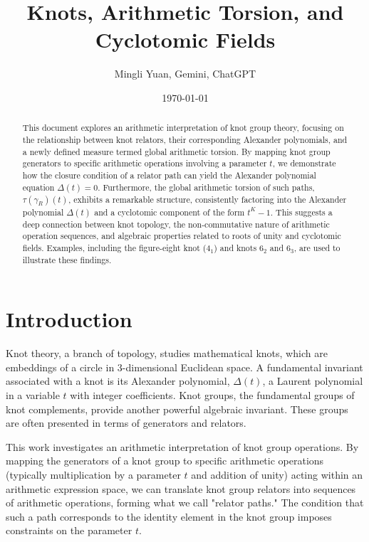 \documentclass{article}[a4paper,12pt]
\title{Knots, Arithmetic Torsion, and Cyclotomic Fields}
\author{Mingli Yuan, Gemini, ChatGPT}
\date{\today}
\begin{document}
\maketitle

\begin{abstract}
This document explores an arithmetic interpretation of knot group theory, focusing on the relationship between knot relators, their corresponding Alexander polynomials, and a newly defined measure termed global arithmetic torsion. By mapping knot group generators to specific arithmetic operations involving a parameter $t$, we demonstrate how the closure condition of a relator path can yield the Alexander polynomial equation $\Delta(t)=0$. Furthermore, the global arithmetic torsion of such paths, $\tau(\gamma_R)(t)$, exhibits a remarkable structure, consistently factoring into the Alexander polynomial $\Delta(t)$ and a cyclotomic component of the form $t^K-1$. This suggests a deep connection between knot topology, the non-commutative nature of arithmetic operation sequences, and algebraic properties related to roots of unity and cyclotomic fields. Examples, including the figure-eight knot ($4_1$) and knots $6_2$ and $6_3$, are used to illustrate these findings.
\end{abstract}

\tableofcontents

\section{Introduction}

Knot theory, a branch of topology, studies mathematical knots, which are embeddings of a circle in 3-dimensional Euclidean space. A fundamental invariant associated with a knot is its Alexander polynomial, $\Delta(t)$, a Laurent polynomial in a variable $t$ with integer coefficients. Knot groups, the fundamental groups of knot complements, provide another powerful algebraic invariant. These groups are often presented in terms of generators and relators.

This work investigates an arithmetic interpretation of knot group operations. By mapping the generators of a knot group to specific arithmetic operations (typically multiplication by a parameter $t$ and addition of unity) acting within an arithmetic expression space, we can translate knot group relators into sequences of arithmetic operations, forming what we call "relator paths." The condition that such a path corresponds to the identity element in the knot group imposes constraints on the parameter $t$.
\end{document}
